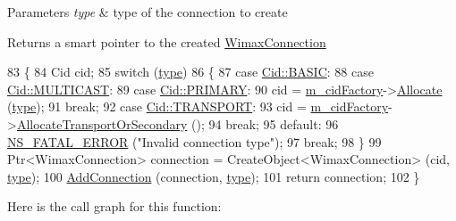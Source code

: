 \begin{DoxyParams}{Parameters}
{\em type} & type of the connection to create \\
\hline
\end{DoxyParams}
\begin{DoxyReturn}{Returns}
a smart pointer to the created \hyperlink{classns3_1_1WimaxConnection}{Wimax\+Connection} 
\end{DoxyReturn}

\begin{DoxyCode}
83 \{
84   Cid cid;
85   \textcolor{keywordflow}{switch} (\hyperlink{visualizer-ideas_8txt_add98db9e15e2a58cf2b57623e7aa893a}{type})
86     \{
87     \textcolor{keywordflow}{case} \hyperlink{classns3_1_1Cid_a10b8f92080ca5790e65a0bfa2f557e0aa68b82b5b38abe3f2b40e5e3d950ac746}{Cid::BASIC}:
88     \textcolor{keywordflow}{case} \hyperlink{classns3_1_1Cid_a10b8f92080ca5790e65a0bfa2f557e0aa4d3bf31623ed09b9755d86bdfa345a4a}{Cid::MULTICAST}:
89     \textcolor{keywordflow}{case} \hyperlink{classns3_1_1Cid_a10b8f92080ca5790e65a0bfa2f557e0aa0ffb28b79686aa37c614c868e330418b}{Cid::PRIMARY}:
90       cid = \hyperlink{classns3_1_1ConnectionManager_afe6ce81283bd4b9cba3545fd8f799c2b}{m\_cidFactory}->\hyperlink{classns3_1_1CidFactory_a59d1440e0e9018066f91dce413db209c}{Allocate} (\hyperlink{visualizer-ideas_8txt_add98db9e15e2a58cf2b57623e7aa893a}{type});
91       \textcolor{keywordflow}{break};
92     \textcolor{keywordflow}{case} \hyperlink{classns3_1_1Cid_a10b8f92080ca5790e65a0bfa2f557e0aa46fbed56841c3bf471aa84de022edf87}{Cid::TRANSPORT}:
93       cid = \hyperlink{classns3_1_1ConnectionManager_afe6ce81283bd4b9cba3545fd8f799c2b}{m\_cidFactory}->\hyperlink{classns3_1_1CidFactory_a8d78cf5c65467740cde02b94f70c4bab}{AllocateTransportOrSecondary} ();
94       \textcolor{keywordflow}{break};
95     \textcolor{keywordflow}{default}:
96       \hyperlink{group__fatal_ga5131d5e3f75d7d4cbfd706ac456fdc85}{NS\_FATAL\_ERROR} (\textcolor{stringliteral}{"Invalid connection type"});
97       \textcolor{keywordflow}{break};
98     \}
99   Ptr<WimaxConnection> connection = CreateObject<WimaxConnection> (cid, \hyperlink{visualizer-ideas_8txt_add98db9e15e2a58cf2b57623e7aa893a}{type});
100   \hyperlink{classns3_1_1ConnectionManager_ad629aae5afc5f487fad910bf3f396dde}{AddConnection} (connection, \hyperlink{visualizer-ideas_8txt_add98db9e15e2a58cf2b57623e7aa893a}{type});
101   \textcolor{keywordflow}{return} connection;
102 \}
\end{DoxyCode}


Here is the call graph for this function\+:




